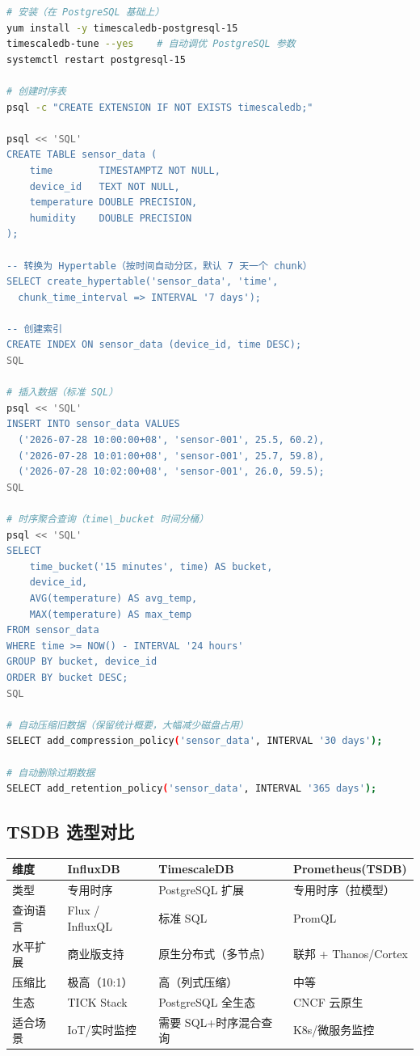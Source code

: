 \documentclass[12pt,UTF8]{ctexbook}
\begin{document}
\begin{lstlisting}[language=bash]
# 安装（在 PostgreSQL 基础上）
yum install -y timescaledb-postgresql-15
timescaledb-tune --yes    # 自动调优 PostgreSQL 参数
systemctl restart postgresql-15

# 创建时序表
psql -c "CREATE EXTENSION IF NOT EXISTS timescaledb;"

psql << 'SQL'
CREATE TABLE sensor_data (
    time        TIMESTAMPTZ NOT NULL,
    device_id   TEXT NOT NULL,
    temperature DOUBLE PRECISION,
    humidity    DOUBLE PRECISION
);

-- 转换为 Hypertable（按时间自动分区，默认 7 天一个 chunk）
SELECT create_hypertable('sensor_data', 'time',
  chunk_time_interval => INTERVAL '7 days');

-- 创建索引
CREATE INDEX ON sensor_data (device_id, time DESC);
SQL

# 插入数据（标准 SQL）
psql << 'SQL'
INSERT INTO sensor_data VALUES
  ('2026-07-28 10:00:00+08', 'sensor-001', 25.5, 60.2),
  ('2026-07-28 10:01:00+08', 'sensor-001', 25.7, 59.8),
  ('2026-07-28 10:02:00+08', 'sensor-001', 26.0, 59.5);
SQL

# 时序聚合查询（time\_bucket 时间分桶）
psql << 'SQL'
SELECT
    time_bucket('15 minutes', time) AS bucket,
    device_id,
    AVG(temperature) AS avg_temp,
    MAX(temperature) AS max_temp
FROM sensor_data
WHERE time >= NOW() - INTERVAL '24 hours'
GROUP BY bucket, device_id
ORDER BY bucket DESC;
SQL

# 自动压缩旧数据（保留统计概要，大幅减少磁盘占用）
SELECT add_compression_policy('sensor_data', INTERVAL '30 days');

# 自动删除过期数据
SELECT add_retention_policy('sensor_data', INTERVAL '365 days');
\end{lstlisting}

\subsection{TSDB 选型对比}

\begin{tabular}{|p{2.5cm}|p{3cm}|p{3cm}|p{3.5cm}|}
\hline
\textbf{维度} & \textbf{InfluxDB} & \textbf{TimescaleDB} & \textbf{Prometheus(TSDB)} \\
\hline
类型 & 专用时序 & PostgreSQL 扩展 & 专用时序（拉模型） \\
\hline
查询语言 & Flux / InfluxQL & 标准 SQL & PromQL \\
\hline
水平扩展 & 商业版支持 & 原生分布式（多节点） & 联邦 + Thanos/Cortex \\
\hline
压缩比 & 极高（10:1） & 高（列式压缩） & 中等 \\
\hline
生态 & TICK Stack & PostgreSQL 全生态 & CNCF 云原生 \\
\hline
适合场景 & IoT/实时监控 & 需要 SQL+时序混合查询 & K8s/微服务监控 \\
\hline
\end{tabular}
\end{document}
